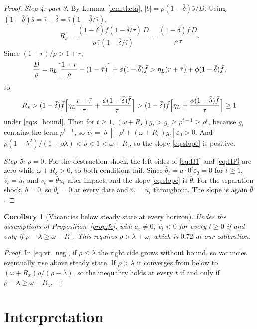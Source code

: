 \documentclass[authoryear, review, 12pt]{elsarticle}
\newtheorem{corollary}{Corollary}
\begin{document}
\begin{proof}
\emph{Step 4: part 3.} By Lemma~\ref{lem:theta}, $\lvert b\rvert=\rho(1-\bar\delta)\bar s/D$.
Using $(1-\bar\delta)\bar s=\bar\tau-\bar\delta=\bar\tau(1-\bar\delta/\bar\tau)$,
\[
	R_s=\frac{(1-\bar\delta)\bar f(1-\bar\delta/\bar\tau)\,D}{\rho\,\bar\tau(1-\bar\delta/\bar\tau)}
	=\frac{(1-\bar\delta)\bar f\,D}{\rho\,\bar\tau}.
\]
Since $(1+r)/\rho>1+r$,
\[
	\frac{D}{\rho}=\eta_L\Bigl[\frac{1+r}{\rho}-(1-\bar\tau)\Bigr]+\phi(1-\bar\delta)\bar f
	>\eta_L(r+\bar\tau)+\phi(1-\bar\delta)\bar f,
\]
so
\[
	R_s>(1-\bar\delta)\bar f\Bigl[\eta_L\frac{r+\bar\tau}{\bar\tau}+\frac{\phi(1-\bar\delta)\bar f}{\bar\tau}\Bigr]
	>(1-\bar\delta)\bar f\Bigl[\eta_L+\frac{\phi(1-\bar\delta)\bar f}{\bar\tau}\Bigr]\ge1
\]
under \eqref{eq:s_bound}. Then for $t\ge1$, $(\omega+R_s)g_t>g_t\ge\rho^{t-1}\ge\rho^t$, because
$g_t$ contains the term $\rho^{t-1}$, so $\hat v_t=\lvert b\rvert[-\rho^t+(\omega+R_s)g_t]\varepsilon_0>0$.
And $\rho(1-\lambda^2)/(1+\rho\lambda)<\rho<1<\omega+R_s$, so the slope \eqref{eq:slope} is
positive.

\emph{Step 5: $\rho=0$.} For the destruction shock, the left sides of \eqref{eq:H1} and
\eqref{eq:HP} are zero while $\omega+R_\delta>0$, so both conditions fail. Since
$\hat\theta_t=a\cdot0^t\varepsilon_0=0$ for $t\ge1$, $\hat v_t=\hat u_t$ and
$v_t=\bar\theta u_t$ after impact, and the slope \eqref{eq:slope} is $\bar\theta$. For the
separation shock, $b=0$, so $\hat\theta_t=0$ at every date and $\hat v_t=\hat u_t$
throughout. The slope is again $\bar\theta$.
\end{proof}

\begin{corollary}[Vacancies below steady state at every horizon]\label{cor:allh}
Under the assumptions of Proposition~\ref{prop:fe}, with $c_x\ne0$, $\hat v_t<0$ for every
$t\ge0$ if and only if $\rho-\lambda\ge\omega+R_x$. This requires $\rho>\lambda+\omega$,
which is $0.72$ at our calibration.
\end{corollary}

\begin{proof}
In \eqref{eq:vt_neg}, if $\rho\le\lambda$ the right side grows without bound, so vacancies
eventually rise above steady state. If $\rho>\lambda$ it converges from below to
$(\omega+R_x)\rho/(\rho-\lambda)$, so the inequality holds at every $t$ if and only if
$\rho-\lambda\ge\omega+R_x$.
\end{proof}

\section{Interpretation}
\end{document}
